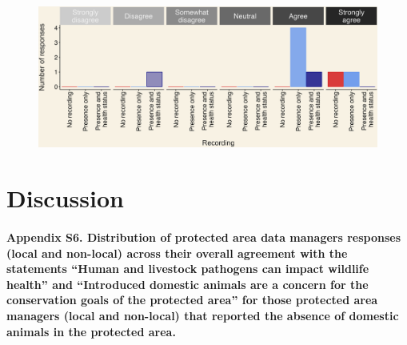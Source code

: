 \documentclass[
  letterpaper,
  DIV=11,
  numbers=noendperiod]{scrartcl}
\let\oldparagraph\paragraph
\renewcommand{\paragraph}[1]{\oldparagraph{#1}\mbox{}}
\begin{document}
\begin{figure}[H]

{\centering \includegraphics[width=6.25in,height=\textheight]{plots/appedix_plot_4.png}

}

\end{figure}

\newpage

\hypertarget{discussion}{%
\section{Discussion}\label{discussion}}

\hypertarget{appendix-s6.-distribution-of-protected-area-data-managers-responses-local-and-non-local-across-their-overall-agreement-with-the-statements-human-and-livestock-pathogens-can-impact-wildlife-health-and-introduced-domestic-animals-are-a-concern-for-the-conservation-goals-of-the-protected-area-for-those-protected-area-managers-local-and-non-local-that-reported-the-absence-of-domestic-animals-in-the-protected-area.}{%
\paragraph{Appendix S6. Distribution of protected area data managers
responses (local and non-local) across their overall agreement with the
statements ``Human and livestock pathogens can impact wildlife health''
and ``Introduced domestic animals are a concern for the conservation
goals of the protected area'' for those protected area managers (local
and non-local) that reported the absence of domestic animals in the
protected
area.}\label{appendix-s6.-distribution-of-protected-area-data-managers-responses-local-and-non-local-across-their-overall-agreement-with-the-statements-human-and-livestock-pathogens-can-impact-wildlife-health-and-introduced-domestic-animals-are-a-concern-for-the-conservation-goals-of-the-protected-area-for-those-protected-area-managers-local-and-non-local-that-reported-the-absence-of-domestic-animals-in-the-protected-area.}}
\end{document}
